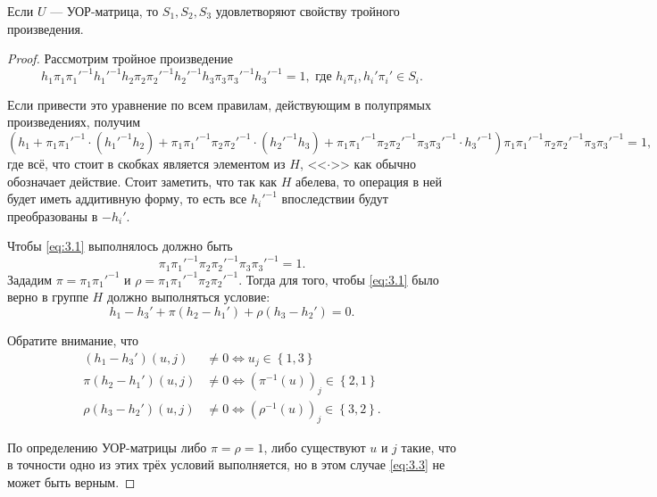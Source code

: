 \begin{prop}\label{prop:05:3.5}
  Если $U$ --- УОР-матрица, то $S_1, S_2, S_3$ удовлетворяют свойству тройного произведения.
\end{prop}
\begin{proof}
  Рассмотрим тройное произведение
  \begin{equation} \label{eq:3.1}
  	h_1 \pi_1 \pi_1'^{-1} h_1'^{-1} h_2 \pi_2 \pi_2'^{-1} h_2'^{-1} h_3 \pi_3 \pi_3'^{-1} h_3'^{-1} = 1, \text{ где } h_i \pi_i, h_i' \pi_i' \in S_i.
  \end{equation}
  
  Если привести это уравнение по всем правилам, действующим в полупрямых произведениях, получим
  \[
  	(h_1 + \pi_1 \pi_1'^{-1} \cdot (h_1'^{-1}h_2) + \pi_1 \pi_1'^{-1} \pi_2 \pi_2'^{-1} \cdot (h_2'^{-1}h_3) + \pi_1 \pi_1'^{-1} \pi_2 \pi_2'^{-1} \pi_3 \pi_3'^{-1} \cdot h_3'^{-1}) \pi_1 \pi_1'^{-1} \pi_2 \pi_2'^{-1} \pi_3 \pi_3'^{-1} = 1,
  \]
  где всё, что стоит в скобках является элементом из $H$, <<$\cdot$>> как обычно обозначает действие. Стоит заметить, что так как $H$ абелева, то операция в ней будет иметь аддитивную форму, то есть все $h_i'^{-1}$ впоследствии будут преобразованы в $-h_i'$.
  
  Чтобы \eqref{eq:3.1} выполнялось должно быть 
  \begin{equation} \label{eq:3.2}
  	\pi_1 \pi_1'^{-1} \pi_2 \pi_2'^{-1} \pi_3 \pi_3'^{-1} = 1.
  \end{equation}
  Зададим $\pi = \pi_1 \pi_1'^{-1}$ и $\rho = \pi_1 \pi_1'^{-1} \pi_2 \pi_2'^{-1}$. Тогда для того, чтобы \eqref{eq:3.1} было верно в группе $H$ должно выполняться условие:
  \begin{equation} \label{eq:3.3}
  	h_1 - h_3' + \pi (h_2 - h_1') + \rho (h_3 - h_2') = 0.
  \end{equation}
  
  Обратите внимание, что
  \begin{align*}
  	(h_1 - h_3')(u,j) & \neq 0  \iff  u_j \in \left\{ 1,3 \right\}\\
  	\pi(h_2 - h_1')(u,j) & \neq 0 \iff  (\pi^{-1}(u))_j \in \left\{ 2,1 \right\}\\
  	\rho(h_3 - h_2')(u,j) & \neq 0 \iff  (\rho^{-1}(u))_j \in \left\{ 3,2 \right\}.
  \end{align*}
  
  По определению УОР-матрицы либо $\pi=\rho=1$, либо существуют $u$ и $j$ такие, что в точности одно из этих трёх условий выполняется, но в этом случае \eqref{eq:3.3} не может быть верным.
  

\end{proof}

